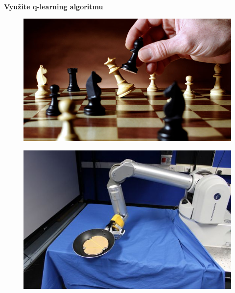 \documentclass[xcolor=dvipsnames]{beamer}
\begin{document}
\begin{frame}{\bf Využite q-learning algoritmu}

\begin{minipage}{.5\textwidth}

  \begin{figure}[!htb]
  \centering
  \includegraphics[scale=.2]{../pictures/chess.jpg}
  \end{figure}

  \begin{figure}[!htb]
  \centering
  \includegraphics[scale=0.2]{../pictures/robot_man.jpg}
  \end{figure}

  \end{minipage}%
\begin{minipage}{.5\textwidth}


\end{minipage}
\end{frame}
\end{document}

